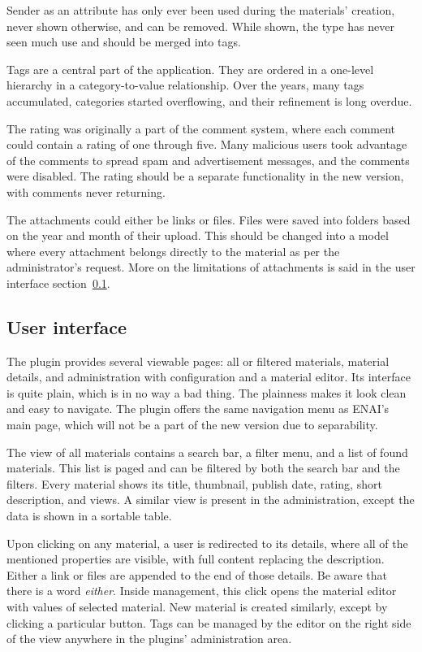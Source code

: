 \documentclass[
  digital,     %
  oneside,     %
  nosansbold,  %
  colorbold, %
  lof,         %
  lot,         %
]{fithesis4}
\begin{document}
Sender as an attribute has only ever been used during the materials' creation, never shown otherwise, and can be removed. While shown, the type has never seen much use and should be merged into tags.

Tags are a central part of the application. They are ordered in a one-level hierarchy in a category-to-value relationship. Over the years, many tags accumulated, categories started overflowing, and their refinement is long overdue.

The rating was originally a part of the comment system, where each comment could contain a rating of one through five. Many malicious users took advantage of the comments to spread spam and advertisement messages, and the comments were disabled. The rating should be a separate functionality in the new version, with comments never returning.

The attachments could either be links or files. Files were saved into folders based on the year and month of their upload. This should be changed into a model where every attachment belongs directly to the material as per the administrator's request. More on the limitations of attachments is said in the user interface section~\ref{subsect:plugin-ui}.

\subsection{User interface}
\label{subsect:plugin-ui}

The plugin provides several viewable pages: all or filtered materials, material details, and administration with configuration and a material editor. Its interface is quite plain, which is in no way a bad thing. The plainness makes it look clean and easy to navigate. The plugin offers the same navigation menu as ENAI's main page, which will not be a part of the new version due to separability.

The view of all materials contains a search bar, a filter menu, and a list of found materials. This list is paged and can be filtered by both the search bar and the filters. Every material shows its title, thumbnail, publish date, rating, short description, and views. A similar view is present in the administration, except the data is shown in a sortable table.

Upon clicking on any material, a user is redirected to its details, where all of the mentioned properties are visible, with full content replacing the description. Either a link or files are appended to the end of those details.
Be aware that there is a word \textit{either}. Inside management, this click opens the material editor with values of selected material. New material is created similarly, except by clicking a particular button. Tags can be managed by the editor on the right side of the view anywhere in the plugins' administration area.
\end{document}
